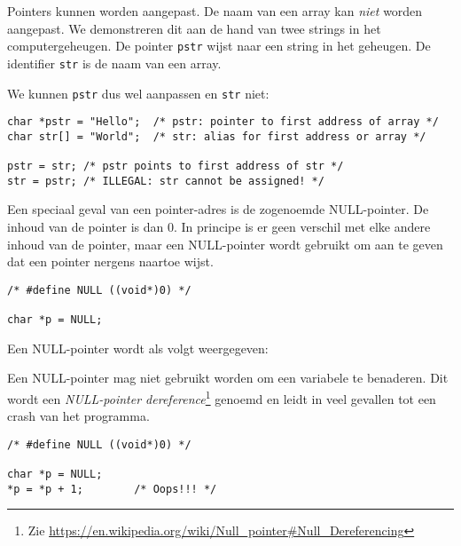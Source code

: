 \documentclass[a4paper,10pt,fleqn,twoside]{article}
\begin{document}
Pointers kunnen worden aangepast. De naam van een array kan \textsl{niet} worden aangepast. We demonstreren dit aan de hand van twee strings in het computergeheugen. De pointer \lstinline|pstr| wijst naar een string in het geheugen. De identifier \lstinline|str| is de naam van een array.

\begin{figure}[!ht]
\centering
{}
\end{figure}

 We kunnen \lstinline|pstr| dus wel aanpassen en \lstinline|str| niet:

\begin{lstlisting}
char *pstr = "Hello";  /* pstr: pointer to first address of array */
char str[] = "World";  /* str: alias for first address or array */

pstr = str; /* pstr points to first address of str */
str = pstr; /* ILLEGAL: str cannot be assigned! */
\end{lstlisting}

Een speciaal geval van een pointer-adres is de zogenoemde NULL-pointer. De inhoud van de pointer is dan 0. In principe is er geen verschil met elke andere inhoud van de pointer, maar een NULL-pointer wordt gebruikt om aan te geven dat een pointer nergens naartoe wijst.

\begin{lstlisting}
/* #define NULL ((void*)0) */

char *p = NULL;
\end{lstlisting}

Een NULL-pointer wordt als volgt weergegeven:

\begin{figure}[!ht]
\centering
{}
\end{figure}

Een NULL-pointer mag niet gebruikt worden om een variabele te benaderen. Dit wordt een \textsl{NULL-pointer dereference}\footnote{Zie \url{https://en.wikipedia.org/wiki/Null_pointer\#Null_Dereferencing}} genoemd en leidt in veel gevallen tot een crash van het programma.

\begin{lstlisting}
/* #define NULL ((void*)0) */

char *p = NULL;
*p = *p + 1;        /* Oops!!! */
\end{lstlisting}
\end{document}
